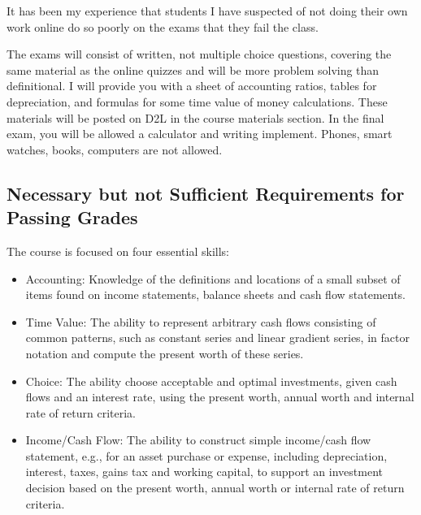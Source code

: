 \documentclass[letterpaper,10pt]{article}
\newif\ifonline
\begin{document}
It has been my experience that students I have suspected of not doing their own work online do so poorly on the exams that they fail the class.

The exams will consist of written, not multiple choice questions, covering the same material as the online quizzes and will be more problem solving than definitional. I will provide you with a sheet of accounting ratios, tables for depreciation, and formulas for some time value of money calculations.  These materials will be posted on D2L in the course materials section.  In the final exam, you will be allowed a calculator and writing implement.  Phones, smart watches, books, computers are not allowed.

\ifonline

\else
   \subsection{ Necessary but not Sufficient Requirements for Passing Grades}\label{sec:essentialSkills}
  
   The course is focused on four essential skills:
   
   \begin{itemize}
   
   \item Accounting: Knowledge of the definitions and locations of a
     small subset of items found on income statements, balance sheets and
     cash flow statements.
   
   \item Time Value: The ability to represent arbitrary cash flows
     consisting of common patterns, such as constant series and linear
     gradient series, in factor notation and compute the present worth of
     these series.
   
   \item Choice: The ability choose acceptable and optimal investments,
     given cash flows and an interest rate, using the present worth,
     annual worth and internal rate of return criteria.
   
   \item Income/Cash Flow: The ability to construct simple income/cash
     flow statement, e.g., for an asset purchase or expense, including
     depreciation, interest, taxes, gains tax and working capital, to
     support an investment decision based on the present worth, annual
     worth or internal rate of return criteria.
   \end{itemize}
   
\end{document}
